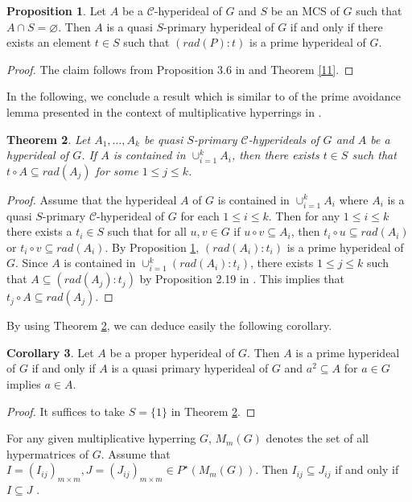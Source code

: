 \documentclass[preprint,review,10pt]{amsart}
\newtheorem{theorem}{Theorem}[section]
\theoremstyle{definition}
\newtheorem{proposition}[theorem]{Proposition}
\newtheorem{corollary}[theorem]{Corollary}
\theoremstyle{remark}
\numberwithin{equation}{section}
\begin{document}
\begin{proposition} \label{13}
Let $A$ be a   $\mathcal{C}$-hyperideal of $G$ and $S$ be an MCS of $G$ such that $A \cap S=\varnothing$. Then $A$ is a quasi $S$-primary hyperideal of $G$ if and only if there exists an element $t \in S$ such that $(rad(P) : t)$ is a prime hyperideal of $G$.
\end{proposition}
\begin{proof}
The claim follows from  Proposition 3.6 in  \cite{Ghiasvand} and Theorem \ref{11}.
\end{proof}
In the following, we conclude a result which is similar to of the prime avoidance lemma  presented in the context of  multiplicative hyperrings in \cite{das}.
\begin{theorem} \label{14}
Let $A_1,\ldots,A_k$ be quasi $S$-primary $\mathcal{C}$-hyperideals of $G$ and $A$ be a hyperideal of $G$. If $A$ is  contained in $\cup_{i=1}^k A_i$, then there exists $t \in S$   such that $t \circ A \subseteq rad(A_j)$ for some $1 \leq j \leq k$.
\end{theorem}
\begin{proof}
Assume that the hyperideal $A$ of $G$ is contained in  $\cup_{i=1}^k A_i$ where $A_i$ is a quasi $S$-primary $\mathcal{C}$-hyperideal of $G$ for each $1 \leq i \leq k$. Then  for any $1 \leq i \leq k$ there exists a $t_i \in S$ such that for all $u,v \in G$ if $u \circ v \subseteq A_i$, then $t_i \circ u \subseteq rad(A_i)$ or $t_i \circ v \subseteq rad(A_i)$. By Proposition \ref{13}, $(rad(A_i):t_i)$ is a prime hyperideal of $G$. Since $A$ is contained in $\cup_{i=1}^k(rad(A_i):t_i)$, there exists $1 \leq j \leq k$ such that  $A \subseteq (rad(A_j):t_j)$ by Proposition 2.19 in \cite{das}. This implies that $t_j \circ A \subseteq rad(A_j)$.
\end{proof}
By using Theorem \ref{14}, we can deduce easily the following
corollary.
\begin{corollary}
Let $A$ be a proper hyperideal of $G$. Then $A$ is a prime hyperideal of $G$ if and only if $A$ is a quasi primary hyperideal of $G$ and $a^2 \subseteq A$ for $a \in G$ implies $a \in A$.
\end{corollary}
\begin{proof}
It suffices to take $S=\{1\}$ in Theorem \ref{14}.
\end{proof}
For any given multiplicative hyperring $G$,  $M_m(G)$ denotes the set of all hypermatrices of $G$. Assume that $I = (I_{ij})_{m \times m}, J = (J_{ij})_{m \times m} \in P^\star (M_m(G))$. Then $I_{ij} \subseteq J_{ij}$ if and only if $I \subseteq J$ \cite{ameri}. 
\end{document}
